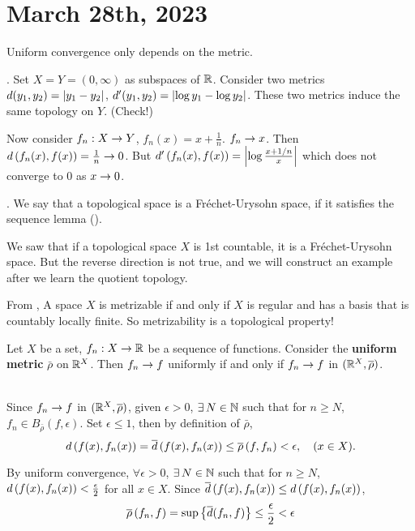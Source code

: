\section*{March 28th, 2023}

Uniform convergence only depends on the metric.

\ex. Set \(X = Y = (0, \infty)\) as subspaces of \(\mathbb{R}\). Consider two metrics \(d(y_1, y_2) = \left| y_1 - y_2 \right|\), \(d'(y_1, y_2) = \left| \log y_1 - \log y_2 \right|\). These two metrics induce the same topology on \(Y\). (Check!)

Now consider \(f_n : X \rightarrow Y\), \(f_n(x) = x + \frac{1}{n}\). \(f_n \rightarrow x\). Then \(d\left( f_n(x), f(x) \right) = \frac{1}{n} \rightarrow 0\). But \(d'\left( f_n(x), f(x) \right) = \left| \log\frac{x + 1/n}{x} \right|\) which does not converge to 0 as \(x \rightarrow 0\).

. We say that a topological space is a Fréchet-Urysohn space, if it satisfies the sequence lemma ().

\rmk We saw that if a topological space \(X\) is 1st countable, it is a Fréchet-Urysohn space. But the reverse direction is not true, and we will construct an example after we learn the quotient topology.

\rmk From  , A space \(X\) is metrizable if and only if \(X\) is regular and has a basis that is countably locally finite. So metrizability is a topological property!

\rmk Let \(X\) be a set, \(f_n : X \rightarrow \mathbb{R}\) be a sequence of functions. Consider the \textbf{uniform metric} \(\bar{\rho}\) on \(\mathbb{R}^X\). Then \(f_n \rightarrow f\) uniformly if and only if \(f_n \rightarrow f\) in \((\mathbb{R}^X, \overline{\rho})\).

\pf \\
\note{\mimpd} Since \(f_n \rightarrow f\) in \((\mathbb{R}^X, \overline{\rho})\), given \(\epsilon > 0\), \(\exists N \in \N\) such that for \(n \geq N\), \(f_n \in B_{\bar{\rho}}(f, \epsilon)\). Set \(\epsilon \leq 1\), then by definition of \(\bar{\rho}\),
\[
    d\left( f(x), f_n(x) \right)= \overline{d}\left( f(x), f_n(x) \right) \leq \overline{\rho}\left( f, f_n \right) < \epsilon, \quad (x \in X).
\]

\note{\mimp} By uniform convergence, \(\forall \epsilon > 0\), \(\exists N \in \N\) such that for \(n \geq N\), \(d\left( f(x), f_n(x) \right) < \frac{\epsilon}{2}\) for all \(x \in X\). Since \(\overline{d}\left( f(x), f_n(x) \right) \leq d\left( f(x), f_n(x) \right)\),
\[
    \overline{\rho}\left( f_n, f \right) = \sup\left\{\overline{d}(f_n, f)\right\} \leq \frac{\epsilon}{2} < \epsilon
\]


